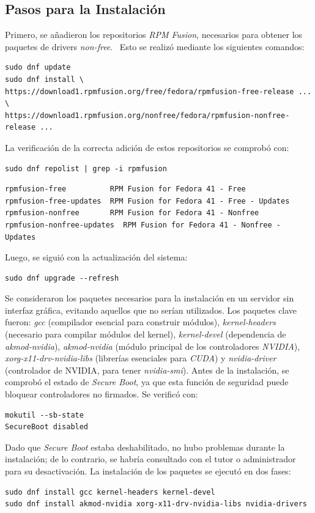 \subsection*{Pasos para la Instalación}
Primero, se añadieron los repositorios \textit{RPM Fusion}, necesarios para obtener los paquetes de drivers \textit{non-free}.~\cite{ref23} Esto se realizó mediante los siguientes comandos:
\begin{verbatim}
sudo dnf update
sudo dnf install \
https://download1.rpmfusion.org/free/fedora/rpmfusion-free-release ... \
https://download1.rpmfusion.org/nonfree/fedora/rpmfusion-nonfree-release ...
\end{verbatim}

La verificación de la correcta adición de estos repositorios se comprobó con:
\begin{verbatim}
sudo dnf repolist | grep -i rpmfusion
\end{verbatim}

\begin{verbatim}
rpmfusion-free          RPM Fusion for Fedora 41 - Free
rpmfusion-free-updates  RPM Fusion for Fedora 41 - Free - Updates
rpmfusion-nonfree       RPM Fusion for Fedora 41 - Nonfree
rpmfusion-nonfree-updates  RPM Fusion for Fedora 41 - Nonfree - Updates
\end{verbatim}

Luego, se siguió con la actualización del sistema:
\begin{verbatim}
sudo dnf upgrade --refresh
\end{verbatim}

Se consideraron los paquetes necesarios para la instalación en un servidor sin interfaz gráfica, evitando aquellos que no serían utilizados. Los paquetes clave fueron: \textit{gcc} (compilador esencial para construir módulos), \textit{kernel-headers} (necesario para compilar módulos del kernel), \textit{kernel-devel} (dependencia de \textit{akmod-nvidia}), \textit{akmod-nvidia} (módulo principal de los controladores \textit{NVIDIA}), \textit{xorg-x11-drv-nvidia-libs} (librerías esenciales para \textit{CUDA}) y \textit{nvidia-driver} (controlador de NVIDIA, para tener \textit{nvidia-smi}).
Antes de la instalación, se comprobó el estado de \textit{Secure Boot}, ya que esta función de seguridad puede bloquear controladores no firmados. Se verificó con:
\begin{verbatim}
mokutil --sb-state
SecureBoot disabled
\end{verbatim}

Dado que \textit{Secure Boot} estaba deshabilitado, no hubo problemas durante la instalación; de lo contrario, se habría consultado con el tutor o administrador para su desactivación.
La instalación de los paquetes se ejecutó en dos fases:
\begin{verbatim}
sudo dnf install gcc kernel-headers kernel-devel
sudo dnf install akmod-nvidia xorg-x11-drv-nvidia-libs nvidia-drivers
\end{verbatim}


